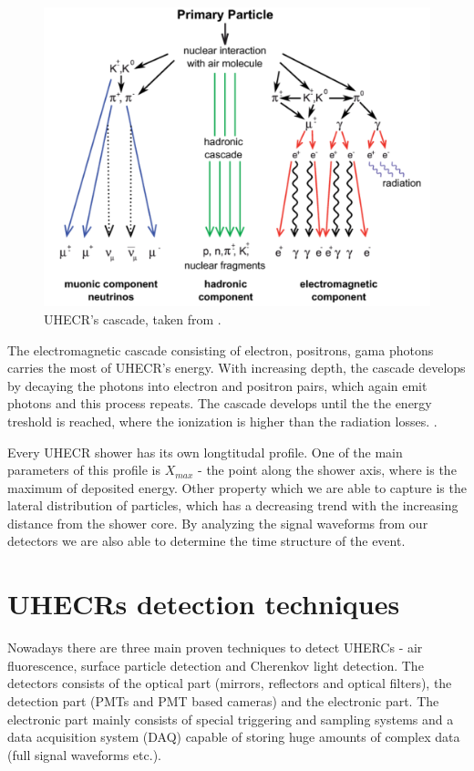 \begin{figure}[H]
 \centering
 \includegraphics[scale = 0.3]{./pictures/cascade}
 \caption{UHECR's cascade, taken from \cite{Cascades}.}
 \label{cascade}
 
\end{figure}

\par

The electromagnetic cascade consisting of electron, positrons, gama photons carries the most of UHECR's energy. With increasing depth, the cascade develops by decaying the photons into electron and positron pairs, which again emit photons and this process repeats. The cascade develops until the the energy treshold is reached, where the ionization is higher than the radiation losses. \cite{Tomankova2016_1000061954}.


\par
Every UHECR shower has its own longtitudal profile. One of the main parameters of this profile is $X_{max}$ - the point along the shower axis, where is the maximum of deposited energy. Other property which we are able to capture is the lateral distribution of particles, which has a decreasing trend with the increasing distance from the shower core. By analyzing the signal waveforms from our detectors we are also able to determine the time structure of the event.

\section{UHECRs detection techniques}
Nowadays there are three main proven techniques to detect UHERCs - 
air fluorescence, surface particle detection and Cherenkov light detection. The detectors consists of the optical part (mirrors, reflectors and optical filters), the detection part (PMTs and PMT based cameras) and the electronic part. The electronic part mainly consists of special triggering and sampling systems and a data acquisition system (DAQ) capable of storing huge amounts of complex data (full signal waveforms etc.).

